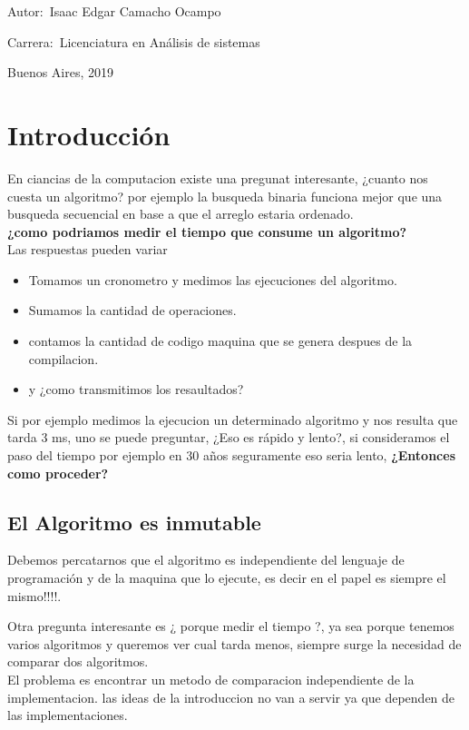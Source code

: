 \documentclass[12pt]{book}
\begin{document}
\noindent Autor:\,	Isaac Edgar Camacho Ocampo
 
\noindent Carrera:\,	Licenciatura en An\'alisis de sistemas

\vspace{1cm}

\vspace{1cm}

\noindent Buenos Aires, 2019

\newpage


\tableofcontents

\tableofcontents
\chapter{Introducción}
En ciancias de la computacion existe una pregunat interesante, ¿cuanto nos cuesta un algoritmo? por ejemplo la busqueda binaria funciona mejor que una busqueda secuencial en base a que el arreglo estaria ordenado.
\\
\textbf{¿como podriamos medir el tiempo que consume un algoritmo?}
\\
Las respuestas pueden variar
\begin{itemize}
\item Tomamos un cronometro y medimos las ejecuciones del algoritmo.
\item Sumamos la cantidad de operaciones.
\item contamos la cantidad de codigo maquina que se genera despues de la compilacion.
\item y ¿como transmitimos los resaultados?
\end{itemize}

Si por ejemplo medimos la ejecucion un determinado algoritmo y nos resulta que tarda 3 ms, uno se puede preguntar, ¿Eso es r\'apido y lento?, si consideramos el paso del tiempo por ejemplo en 30 años seguramente eso seria lento, 
\textbf{¿Entonces como proceder?}

\section{El Algoritmo es inmutable}
Debemos percatarnos que el algoritmo es independiente del lenguaje de programaci\'on y de la maquina que lo ejecute, es decir en el papel es siempre el mismo!!!!.

Otra pregunta interesante es ¿ porque medir el tiempo ?, ya sea porque tenemos varios algoritmos y queremos ver cual tarda menos, siempre surge la necesidad de comparar dos algoritmos.
\\
El problema es encontrar un metodo de comparacion independiente de la implementacion.
las ideas de la introduccion no van a servir ya que dependen de las implementaciones.
\end{document}
